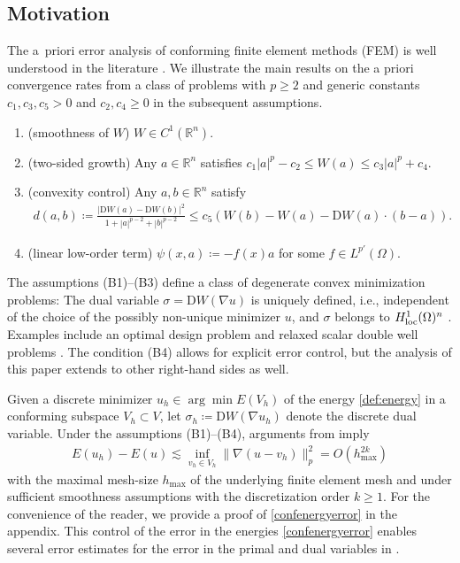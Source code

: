 \documentclass[a4paper]{amsart}
\numberwithin{equation}{section}
\newcommand{\D}{\mathrm{D}}
\theoremstyle{remark}
\begin{document}
\subsection{Motivation}
The a~priori error analysis of conforming finite element methods (FEM)
is well understood in the literature \cite{GlowinskiMarrocco1975,Chow1989,CPlechac1997}. 
We illustrate the main results on the a priori convergence rates from a class
of problems with $p \geq 2$ and generic constants $c_1,c_3,c_5 > 0$ and $c_2,c_4 \geq 0$ in the subsequent assumptions. 
\begin{enumerate}[wide]
    \item[(B1)] (smoothness of $W$) $W \in C^1(\mathbb{R}^n)$.
    \item[(B2)] (two-sided growth) Any $a \in \mathbb{R}^n$ satisfies
$       c_1|a|^p - c_2 \leq W(a) \leq c_3|a|^p + c_4  $.
    \item[(B3)] (convexity control)
Any $a,b \in \mathbb{R}^n$ satisfy\begin{align*}
    d(a,b) \coloneqq \frac{ |\D W(a) - \D W(b)|^2}{ 1 + |a|^{p-2} + |b|^{p-2}}
\leq c_5\left(W(b) - W(a) - \D W(a) \cdot (b - a)\right).
\end{align*}   %
\item[(B4)] (linear low-order term) $\psi(x,a) \coloneqq -f(x) a$ 
for some $f \in L^{p'}(\Omega)$.
\end{enumerate}
The assumptions (B1)--(B3) define a class of degenerate convex minimization problems:
The dual variable $\sigma = \D W(\nabla u)$ is uniquely defined, i.e.,  
independent of the choice of the possibly non-unique minimizer $u$, 
and $\sigma$ belongs to  $H^1_{\rm loc}(\Omega)^n$ 
\cite{CPlechac1997,CarstensenMueller2002}.
%
Examples include an optimal design problem \cite{KohnStrang1986,BartelsC2008} and relaxed 
scalar double well problems \cite{CPlechac1997}.
%
The condition (B4) allows for explicit error control, but the analysis of this paper extends to other right-hand sides as well.

Given a discrete minimizer $u_h \in \arg\min E(V_h)$ of the energy 
\eqref{def:energy}
in a conforming subspace  $V_h \subset V$,  let $\sigma_h \coloneqq \D W(\nabla u_h)$ denote the discrete dual variable. 
Under the assumptions (B1)--(B4),
arguments from \cite{GlowinskiMarrocco1975,Chow1989,CPlechac1997} imply 
\begin{align}\label{confenergyerror}
E(u_h) - E(u) \lesssim \inf_{v_h \in V_h} \|\nabla(u - v_h)\|_p^2 
=O(h_{\max}^{2k})
\end{align}
with the maximal mesh-size $h_{\max}$ of the underlying finite element mesh
and under sufficient smoothness assumptions 
with the discretization order $k \geq 1$. For the convenience of the reader, we provide a proof of \eqref{confenergyerror} in the appendix.
This control of the error in the energies \eqref{confenergyerror}  enables several
error estimates for the error in the primal and dual variables
in \cite{GlowinskiMarrocco1975,Chow1989,CPlechac1997}.
\end{document}
